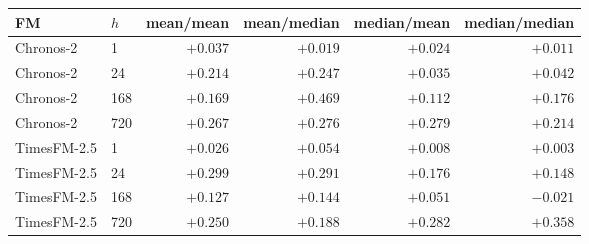 \begin{tabular}{llrrrr}
\toprule
FM & $h$ & mean/mean & mean/median & median/mean & median/median \\
\midrule
Chronos-2 & 1 & $+0.037$ & $+0.019$ & $+0.024$ & $+0.011$ \\
Chronos-2 & 24 & $+0.214$ & $+0.247$ & $+0.035$ & $+0.042$ \\
Chronos-2 & 168 & $+0.169$ & $+0.469$ & $+0.112$ & $+0.176$ \\
Chronos-2 & 720 & $+0.267$ & $+0.276$ & $+0.279$ & $+0.214$ \\
TimesFM-2.5 & 1 & $+0.026$ & $+0.054$ & $+0.008$ & $+0.003$ \\
TimesFM-2.5 & 24 & $+0.299$ & $+0.291$ & $+0.176$ & $+0.148$ \\
TimesFM-2.5 & 168 & $+0.127$ & $+0.144$ & $+0.051$ & $-0.021$ \\
TimesFM-2.5 & 720 & $+0.250$ & $+0.188$ & $+0.282$ & $+0.358$ \\
\bottomrule
\end{tabular}
